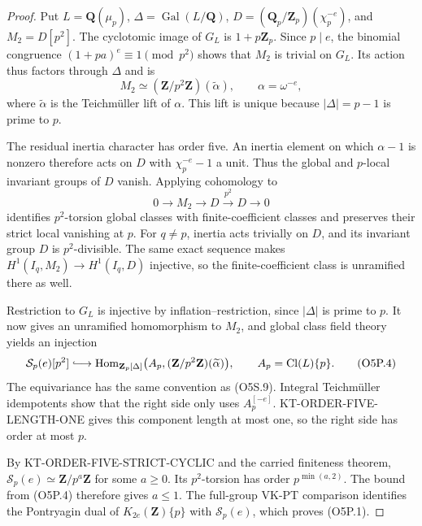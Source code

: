 \documentclass[11pt,a4paper]{article}
\theoremstyle{definition}
\begin{document}
\begin{proof}
Put $L=\mathbf Q(\mu_p)$, $\Delta=\operatorname{Gal}(L/\mathbf Q)$,
$D=(\mathbf Q_p/\mathbf Z_p)(\chi_p^{-e})$, and $M_2=D[p^2]$.
The cyclotomic image of $G_L$ is $1+p\mathbf Z_p$.
Since $p\mid e$, the binomial congruence
$(1+pa)^e\equiv1\pmod {p^2}$ shows that $M_2$ is trivial on
$G_L$.  Its action thus factors through $\Delta$ and is
\[
                M_2\simeq(\mathbf Z/p^2\mathbf Z)(\widetilde\alpha),
                \qquad\alpha=\omega^{-e},                \tag{O5P.2}
\]
where $\widetilde\alpha$ is the Teichm\"uller lift of $\alpha$.
This lift is unique because $|\Delta|=p-1$ is prime to $p$.

The residual inertia character has order five.  An inertia element
on which $\alpha-1$ is nonzero therefore acts on $D$ with
$\chi_p^{-e}-1$ a unit.  Thus the global and $p$-local invariant
groups of $D$ vanish.  Applying cohomology to
\[
 0\longrightarrow M_2\longrightarrow D
       \xrightarrow{\ p^2\ }D\longrightarrow0             \tag{O5P.3}
\]
identifies $p^2$-torsion global classes with finite-coefficient
classes and preserves their strict local vanishing at $p$.
For $q\ne p$, inertia acts trivially on $D$, and its invariant
group $D$ is $p^2$-divisible.  The same exact sequence makes
$H^1(I_q,M_2)\longrightarrow H^1(I_q,D)$ injective, so the
finite-coefficient class is unramified there as well.

Restriction to $G_L$ is injective by inflation--restriction,
since $|\Delta|$ is prime to $p$.
It now gives an unramified homomorphism to $M_2$, and global
class field theory yields an injection
\[
 \mathcal S_p(e)[p^2]\lhook\joinrel\longrightarrow
 \operatorname{Hom}_{\mathbf Z_p[\Delta]}
   \bigl(A_p, (\mathbf Z/p^2\mathbf Z)(\widetilde\alpha)\bigr),
 \qquad A_p=\operatorname{Cl}(L)\{p\}.                   \tag{O5P.4}
\]
The equivariance has the same convention as (O5S.9).
Integral Teichm\"uller idempotents show that the right side
only uses $A_p^{[-e]}$.  KT-ORDER-FIVE-LENGTH-ONE gives this
component length at most one, so the right side has order
at most $p$.

By KT-ORDER-FIVE-STRICT-CYCLIC and the carried finiteness theorem,
$\mathcal S_p(e)\simeq\mathbf Z/p^a\mathbf Z$ for some $a\ge0$.
Its $p^2$-torsion has order $p^{\min(a,2)}$.
The bound from (O5P.4) therefore gives $a\le1$.
The full-group VK-PT comparison identifies the Pontryagin dual
of $K_{2e}(\mathbf Z)\{p\}$ with $\mathcal S_p(e)$,
which proves (O5P.1).
\end{proof}
\end{document}
